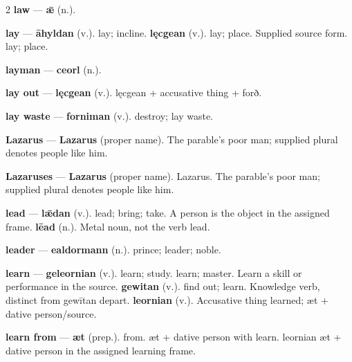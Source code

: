 \begin{multicols}{2}
\textbf{law} — \textbf{ǣ} (n.).\par
\textbf{lay} — \textbf{āhyldan} (v.). lay; incline. \textbf{lęcgean} (v.). lay; place. Supplied source form. lay; place.\par
\textbf{layman} — \textbf{ceorl} (n.).\par
\textbf{lay out} — \textbf{lęcgean} (v.). lęcgean + accusative thing + forð.\par
\textbf{lay waste} — \textbf{forniman} (v.). destroy; lay waste.\par
\textbf{Lazarus} — \textbf{Lazarus} (proper name). The parable's poor man; supplied plural denotes people like him.\par
\textbf{Lazaruses} — \textbf{Lazarus} (proper name). Lazarus. The parable's poor man; supplied plural denotes people like him.\par
\textbf{lead} — \textbf{lǣdan} (v.). lead; bring; take. A person is the object in the assigned frame. \textbf{lēad} (n.). Metal noun, not the verb lead.\par
\textbf{leader} — \textbf{ealdormann} (n.). prince; leader; noble.\par
\textbf{learn} — \textbf{geleornian} (v.). learn; study. learn; master. Learn a skill or performance in the source. \textbf{gewitan} (v.). find out; learn. Knowledge verb, distinct from gewītan depart. \textbf{leornian} (v.). Accusative thing learned; æt + dative person/source.\par
\textbf{learn from} — \textbf{æt} (prep.). from. æt + dative person with learn. leornian æt + dative person in the assigned learning frame.\par

\end{multicols}
